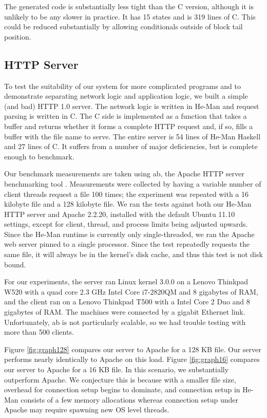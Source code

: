 \documentclass[preprint]{sigplanconf}
\begin{document}
The generated code is substantially less tight than the C version,
although it is unlikely to be any slower in practice. It has 15 states
and is 319 lines of C. This could be reduced substantially by allowing
conditionals outside of block tail position.

\subsection{HTTP Server}

To test the suitability of our system for more complicated programs
and to demonstrate separating network logic and application logic, we
built a simple (and bad) HTTP 1.0 server. The network logic is written
in He-Man and request parsing is written in C. The C side is
implemented as a function that takes a buffer and returns whether it
forms a complete HTTP request and, if so, fills a buffer with the
file name to serve. The entire server is 54 lines of He-Man Haskell and
27 lines of C. It suffers from a number of major deficiencies, but is
complete enough to benchmark.

Our benchmark measurements are taken using ab, the Apache HTTP server
benchmarking tool \cite{ApacheAB}. Measurements were collected by
having a variable number of client threads request a file 100 times;
the experiment was repeated with a 16 kilobyte file and a 128 kilobyte
file. We ran the tests against both our He-Man HTTP server and Apache
2.2.20, installed with the default Ubuntu 11.10 settings, except for
client, thread, and process limits being adjusted upwards. Since the
He-Man runtime is currently only single-threaded, we ran the Apache
web server pinned to a single processor. Since the test repeatedly
requests the same file, it will always be in the kernel's disk cache,
and thus this test is not disk bound.

For our experiments, the server ran Linux kernel 3.0.0 on a Lenovo
Thinkpad W520 with a quad core 2.3 GHz Intel Core i7-2820QM and 8
gigabytes of RAM, and the client ran on a Lenovo Thinkpad T500 with a
Intel Core 2 Duo and 8 gigabytes of RAM.  %
The machines were connected by a gigabit Ethernet link.
Unfortunately, ab is not particularly scalable, so we had trouble
testing with more than 500 clients.

Figure \ref{fig:graph128} compares our server to Apache for a 128 KB
file. Our server performs nearly identically to Apache on this load.
Figure \ref{fig:graph16} compares our server to Apache for a 16 KB
file. In this scenario, we substantially outperform Apache. We
conjecture this is because with a smaller file size, overhead for
connection setup begins to dominate, and connection setup in He-Man
consists of a few memory allocations whereas connection setup under
Apache may require spawning new OS level threads.
\end{document}
